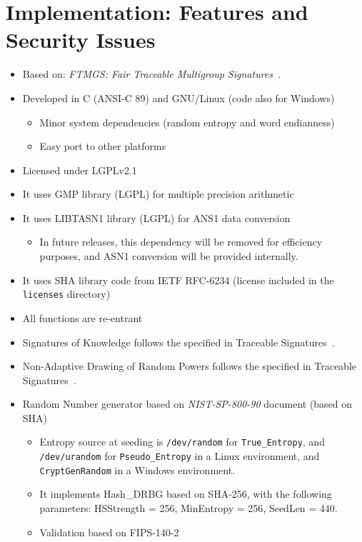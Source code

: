 \documentclass[a4paper]{article}
\begin{document}
\section{Implementation: Features and Security Issues}
\begin{itemize}%
\item Based on: \emph{FTMGS: Fair Traceable Multigroup
  Signatures}~\cite{bcly:2008:ftmgs}.

\item Developed in C (ANSI-C 89) and GNU/Linux (code also for Windows)
\begin{itemize}%
\item Minor system dependencies (random entropy and word endianness)
\item Easy port to other platforms
\end{itemize}%

\item Licensed under LGPLv2.1

\item It uses GMP library (LGPL) for multiple precision arithmetic

\item It uses LIBTASN1 library (LGPL) for ANS1 data conversion
\begin{itemize}%
\item In future releases, this dependency will be removed for
      efficiency purposes, and ASN1 conversion will be provided
      internally.
\end{itemize}%

\item It uses SHA library code from IETF RFC-6234 (license included in
  the \verb|licenses| directory)

\item All functions are re-entrant

\item Signatures of Knowledge follows the specified in
        Traceable Signatures~\cite{KTY04}.

\item Non-Adaptive Drawing of Random Powers follows the specified in
        Traceable Signatures~\cite{KTY04}.

\item Random Number generator based on \emph{NIST-SP-800-90} document
  (based on SHA) 
  \begin{itemize}%
  \item Entropy source at seeding is \verb|/dev/random| for
    \verb|True_Entropy|, and \verb|/dev/urandom| for
    \verb|Pseudo_Entropy| in a Linux environment, and
    \verb|CryptGenRandom| in a Windows environment.
  \item It implements Hash\_DRBG based on SHA-256, with the following
    parameters: HSStrength = 256, MinEntropy = 256, SeedLen = 440.
  \item Validation based on FIPS-140-2
  \end{itemize}%


\end{itemize}
\end{document}
